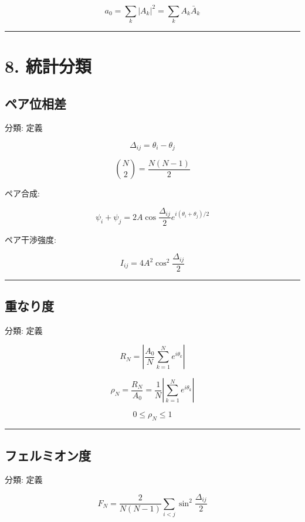 \documentclass[
  a4paper,
]{ltjsarticle}
\begin{document}
\[
a_0=\sum_k |A_k|^2=\sum_k A_k\bar A_k
\]

\begin{center}\rule{0.5\linewidth}{0.5pt}\end{center}

\section{8. 統計分類}\label{ux7d71ux8a08ux5206ux985e}

\subsection{ペア位相差}\label{ux30daux30a2ux4f4dux76f8ux5dee}

分類: 定義

\[
\Delta_{ij}=\theta_i-\theta_j
\]

\[
\binom{N}{2}=\frac{N(N-1)}{2}
\]

ペア合成:

\[
\psi_i+\psi_j
=2A\cos\frac{\Delta_{ij}}{2}e^{i(\theta_i+\theta_j)/2}
\]

ペア干渉強度:

\[
I_{ij}=4A^2\cos^2\frac{\Delta_{ij}}{2}
\]

\begin{center}\rule{0.5\linewidth}{0.5pt}\end{center}

\subsection{重なり度}\label{ux91cdux306aux308aux5ea6}

分類: 定義

\[
R_N=\left|\frac{A_0}{N}\sum_{k=1}^{N}e^{i\theta_k}\right|
\]

\[
\rho_N=\frac{R_N}{A_0}
=\frac{1}{N}\left|\sum_{k=1}^{N}e^{i\theta_k}\right|
\]

\[
0\le\rho_N\le1
\]

\begin{center}\rule{0.5\linewidth}{0.5pt}\end{center}

\subsection{フェルミオン度}\label{ux30d5ux30a7ux30ebux30dfux30aaux30f3ux5ea6}

分類: 定義

\[
F_N=
\frac{2}{N(N-1)}
\sum_{i<j}\sin^2\frac{\Delta_{ij}}{2}
\]
\end{document}

